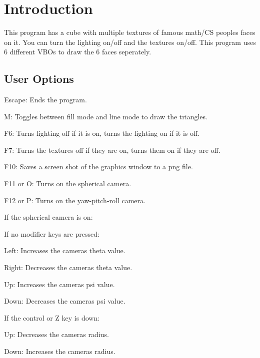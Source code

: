 \hypertarget{index_intro}{}\section{Introduction}\label{index_intro}
This program has a cube with multiple textures of famous math/\+CS people\textquotesingle{}s faces on it. You can turn the lighting on/off and the textures on/off. This program uses 6 different V\+BO\textquotesingle{}s to draw the 6 faces seperately.\hypertarget{index_options}{}\subsection{User Options}\label{index_options}

\begin{DoxyItemize}
\item Escape\+: Ends the program.
\item M\+: Toggles between fill mode and line mode to draw the triangles.
\item F6\+: Turns lighting off if it is on, turns the lighting on if it is off.
\item F7\+: Turns the textures off if they are on, turns them on if they are off.
\item F10\+: Saves a screen shot of the graphics window to a png file.
\item F11 or O\+: Turns on the spherical camera.
\item F12 or P\+: Turns on the yaw-\/pitch-\/roll camera.
\end{DoxyItemize}

If the spherical camera is on\+:

If no modifier keys are pressed\+:


\begin{DoxyItemize}
\item Left\+: Increases the camera\textquotesingle{}s theta value.
\item Right\+: Decreases the camera\textquotesingle{}s theta value.
\item Up\+: Increases the camera\textquotesingle{}s psi value.
\item Down\+: Decreases the camera\textquotesingle{}s psi value.
\end{DoxyItemize}

If the control or Z key is down\+:


\begin{DoxyItemize}
\item Up\+: Decreases the camera\textquotesingle{}s radius.
\item Down\+: Increases the camera\textquotesingle{}s radius.
\end{DoxyItemize}

